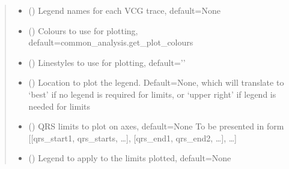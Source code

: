 \documentclass[letterpaper,10pt,english]{sphinxmanual}
\begin{document}
\begin{fulllineitems}
\begin{quote}
\begin{description}
\begin{itemize}
\item {} 
\sphinxAtStartPar
{} (\sphinxstyleliteralemphasis{\sphinxupquote{, }}) \textendash{} Legend names for each VCG trace, default=None

\item {} 
\sphinxAtStartPar
{} (\sphinxstyleliteralemphasis{\sphinxupquote{, }}) \textendash{} Colours to use for plotting, default=common\_analysis.get\_plot\_colours

\item {} 
\sphinxAtStartPar
{} (\sphinxstyleliteralemphasis{\sphinxupquote{, }}) \textendash{} Linestyles to use for plotting, default=’\sphinxhyphen{}’

\item {} 
\sphinxAtStartPar
{} (\sphinxstyleliteralemphasis{\sphinxupquote{, }}) \textendash{} Location to plot the legend. Default=None, which will translate to ‘best’ if no legend is required for
limits, or ‘upper right’ if legend is needed for limits

\item {} 
\sphinxAtStartPar
{} (\sphinxstyleliteralemphasis{\sphinxupquote{, }}) \textendash{} QRS limits to plot on axes, default=None
To be presented in form {[}{[}qrs\_start1, qrs\_starts, …{]}, {[}qrs\_end1, qrs\_end2, …{]}, …{]}

\item {} 
\sphinxAtStartPar
{} (\sphinxstyleliteralemphasis{\sphinxupquote{, }}) \textendash{} Legend to apply to the limits plotted, default=None


\end{itemize}
\end{description}
\end{quote}
\end{fulllineitems}
\end{document}
